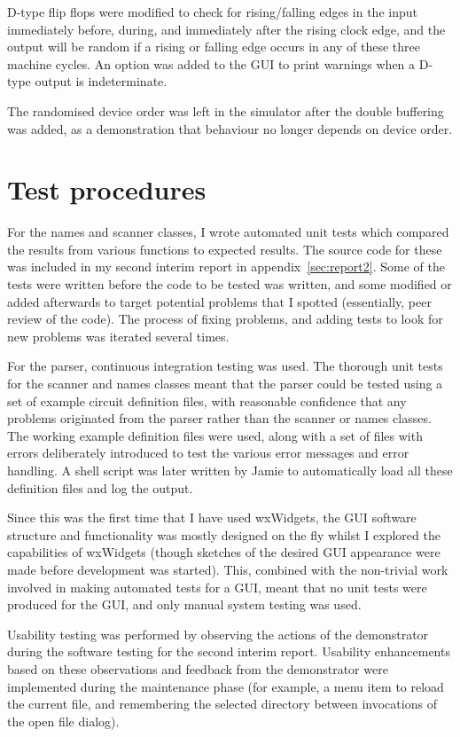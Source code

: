 \documentclass[a4paper,10pt]{article}
\begin{document}
D-type flip flops were modified to check for rising/falling edges in the input immediately before, during, and immediately after the rising clock edge, and the output will be random if a rising or falling edge occurs in any of these three machine cycles. An option was added to the GUI to print warnings when a D-type output is indeterminate.

The randomised device order was left in the simulator after the double buffering was added, as a demonstration that behaviour no longer depends on device order. 

\section{Test procedures}

For the names and scanner classes, I wrote automated unit tests which compared the results from various functions to expected results. The source code for these was included in my second interim report in appendix~\ref{sec:report2}. Some of the tests were written before the code to be tested was written, and some modified or added afterwards to target potential problems that I spotted (essentially, peer review of the code). The process of fixing problems, and adding tests to look for new problems was iterated several times. 

For the parser, continuous integration testing was used. The thorough unit tests for the scanner and names classes meant that the parser could be tested using a set of example circuit definition files, with reasonable confidence that any problems originated from the parser rather than the scanner or names classes. The working example definition files were used, along with a set of files with errors deliberately introduced to test the various error messages and error handling. A shell script was later written by Jamie to automatically load all these definition files and log the output. 

Since this was the first time that I have used wxWidgets, the GUI software structure and functionality was mostly designed on the fly whilst I explored the capabilities of wxWidgets (though sketches of the desired GUI appearance were made before development was started). This, combined with the non-trivial work involved in making automated tests for a GUI, meant that no unit tests were produced for the GUI, and only manual system testing was used. 

Usability testing was performed by observing the actions of the demonstrator during the software testing for the second interim report. Usability enhancements based on these observations and feedback from the demonstrator were implemented during the maintenance phase (for example, a menu item to reload the current file, and remembering the selected directory between invocations of the open file dialog). 
\end{document}
